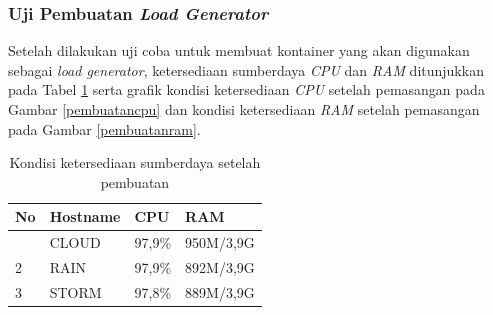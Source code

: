 			\subsubsection{Uji Pembuatan \textit{Load Generator}}
			
				Setelah dilakukan uji coba untuk membuat kontainer yang akan digunakan sebagai \textit{load generator}, 
				ketersediaan sumberdaya \textit{CPU} dan \textit{RAM} ditunjukkan pada Tabel \ref{suberdayasetpembuatan} serta grafik  kondisi ketersediaan \textit{CPU} setelah pemasangan pada Gambar \ref{pembuatancpu} dan kondisi ketersediaan \textit{RAM} setelah pemasangan pada Gambar \ref{pembuatanram}.
				\begin{longtable}{|p{}|p{}|p{}|p{}|}
					\caption{Kondisi ketersediaan sumberdaya setelah pembuatan} \label{suberdayasetpembuatan} \\
					\hline
					\textbf{No} & \textbf{Hostname} & \textbf{CPU} & \textbf{RAM} \\ \hline
					\endhead
					\endfoot
					\endlastfoot
					1 & CLOUD & 97,9\% & 950M/3,9G \\ \hline
					2 & RAIN & 97,9\% & 892M/3,9G \\ \hline
					3 & STORM & 97,8\% & 889M/3,9G \\ \hline
				\end{longtable}
				
